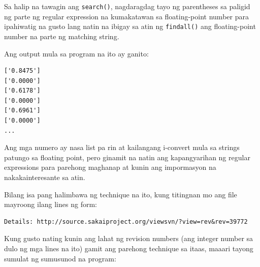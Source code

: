 \documentclass[10pt,]{book}
\newenvironment{Shaded}{}{}
\newcommand{\BuiltInTok}[1]{\textcolor[rgb]{0.00,0.50,0.00}{#1}}
\newcommand{\CommentTok}[1]{\textcolor[rgb]{0.38,0.63,0.69}{\textit{#1}}}
\newcommand{\ControlFlowTok}[1]{\textcolor[rgb]{0.00,0.44,0.13}{\textbf{#1}}}
\newcommand{\DecValTok}[1]{\textcolor[rgb]{0.25,0.63,0.44}{#1}}
\newcommand{\ImportTok}[1]{\textcolor[rgb]{0.00,0.50,0.00}{\textbf{#1}}}
\newcommand{\KeywordTok}[1]{\textcolor[rgb]{0.00,0.44,0.13}{\textbf{#1}}}
\newcommand{\NormalTok}[1]{#1}
\newcommand{\OperatorTok}[1]{\textcolor[rgb]{0.40,0.40,0.40}{#1}}
\newcommand{\PreprocessorTok}[1]{\textcolor[rgb]{0.74,0.48,0.00}{#1}}
\newcommand{\StringTok}[1]{\textcolor[rgb]{0.25,0.44,0.63}{#1}}
\newcommand{\VerbatimStringTok}[1]{\textcolor[rgb]{0.25,0.44,0.63}{#1}}
\begin{document}
Sa halip na tawagin ang \texttt{search()}, nagdaragdag tayo ng
parentheses sa paligid ng parte ng regular expression na kumakatawan sa
floating-point number para ipahiwatig na gusto lang natin na ibigay sa
atin ng \texttt{findall()} ang floating-point number na parte ng
matching string.

Ang output mula sa program na ito ay ganito:

{\small
\begin{verbatim}
['0.8475']
['0.0000']
['0.6178']
['0.0000']
['0.6961']
['0.0000']
...
\end{verbatim}
}

Ang mga numero ay nasa list pa rin at kailangang i-convert mula sa
strings patungo sa floating point, pero ginamit na natin ang
kapangyarihan ng regular expressions para parehong maghanap at kunin ang
impormasyon na nakakainteresante sa atin.

Bilang isa pang halimbawa ng technique na ito, kung titingnan mo ang
file mayroong ilang lines ng form:

{\small
\begin{verbatim}
Details: http://source.sakaiproject.org/viewsvn/?view=rev&rev=39772
\end{verbatim}
}

Kung gusto nating kunin ang lahat ng revision numbers (ang integer
number sa dulo ng mga lines na ito) gamit ang parehong technique sa
itaas, maaari tayong sumulat ng sumusunod na program:

\begin{Shaded}
\end{Shaded}
\end{document}
